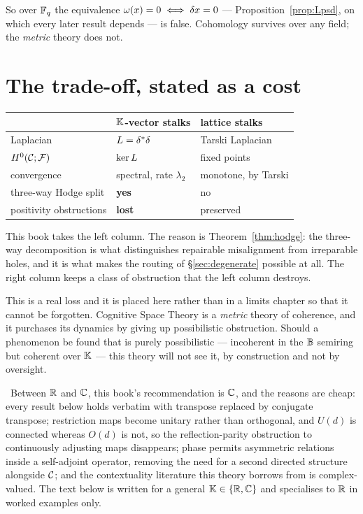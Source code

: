 So over $\mathbb{F}_{q}$ the equivalence $\omega(x)=0\iff\delta x=0$ ---
Proposition~\ref{prop:Lpsd}, on which every later result depends --- is false.
Cohomology survives over any field; the \emph{metric} theory does not.

\section{The trade-off, stated as a cost}\label{sec:tradeoff}

\begin{center}
\begin{tabular}{@{}>{\raggedright\arraybackslash}p{}%
                  >{\raggedright\arraybackslash}p{}%
                  >{\raggedright\arraybackslash}p{}@{}}
\toprule
 & \textbf{$\mathbb{K}$-vector stalks} & \textbf{lattice stalks}~\cite{GhristRiess}\\
\midrule
Laplacian & $L=\delta^{\ast}\delta$ & Tarski Laplacian\\
$H^{0}(\mathcal{C};\mathcal{F})$ & $\ker L$ & fixed points\\
convergence & spectral, rate $\lambda_2$ & monotone, by Tarski\\
three-way Hodge split & \textbf{yes} & no\\
positivity obstructions & \textbf{lost} & preserved\\
\bottomrule
\end{tabular}
\end{center}

This book takes the left column. The reason is Theorem~\ref{thm:hodge}: the
three-way decomposition is what distinguishes repairable misalignment from
irreparable holes, and it is what makes the routing of
\S\ref{sec:degenerate} possible at all. The right column keeps a class of
obstruction that the left column destroys.

\begin{hon}\Hon
This is a real loss and it is placed here rather than in a limits chapter so
that it cannot be forgotten. Cognitive Space Theory is a \emph{metric} theory
of coherence, and it purchases its dynamics by giving up possibilistic
obstruction. Should a phenomenon be found that is purely possibilistic ---
incoherent in the $\mathbb{B}$ semiring but coherent over $\mathbb{K}$ --- this theory
will not see it, by construction and not by oversight.
\end{hon}

\begin{hon}\Hon
\Proposed\ Between $\mathbb{R}$ and $\mathbb{C}$, this book's recommendation is $\mathbb{C}$, and
the reasons are cheap: every result below holds verbatim with transpose
replaced by conjugate transpose; restriction maps become unitary rather than
orthogonal, and $U(d)$ is connected whereas $O(d)$ is not, so the
reflection-parity obstruction to continuously adjusting maps disappears;
phase permits asymmetric relations inside a self-adjoint operator, removing
the need for a second directed structure alongside $\mathcal{C}$; and the
contextuality literature this theory borrows from is complex-valued. The text
below is written for a general $\mathbb{K}\in\{\mathbb{R},\mathbb{C}\}$ and specialises to $\mathbb{R}$
in worked examples only.
\end{hon}

